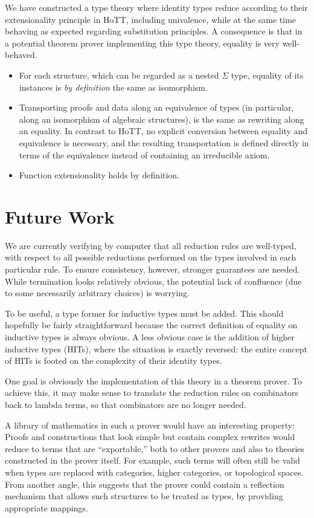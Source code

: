 \documentclass[a4paper]{article}
\theoremstyle{definition}
\theoremstyle{remark}
\newcommand{\0}{\primType{0}}
\newcommand{\1}{\primType{1}}
\newcommand{\2}{\primType{2}}
\begin{document}
We have constructed a type theory where identity types reduce according to their extensionality
principle in HoTT, including univalence, while at the same time behaving as expected regarding
substitution principles. A consequence is that in a potential theorem prover implementing this type
theory, equality is very well-behaved.
\begin{itemize}
  \item For each structure, which can be regarded as a nested $\Sigma$ type, equality of its
  instances is \emph{by definition} the same as isomorphism.
  \item Transporting proofs and data along an equivalence of types (in particular, along an
  isomorphism of algebraic structures), is the same as rewriting along an equality. In contrast to
  HoTT, no explicit conversion between equality and equivalence is necessary, and the resulting
  transportation is defined directly in terms of the equivalence instead of containing an
  irreducible axiom.
  \item Function extensionality holds by definition.
\end{itemize}

\section{Future Work}

We are currently verifying by computer that all reduction rules are well-typed, with respect to all
possible reductions performed on the types involved in each particular rule. To ensure consistency,
however, stronger guarantees are needed. While termination looks relatively obvious, the potential
lack of confluence (due to some necessarily arbitrary choices) is worrying.

To be useful, a type former for inductive types must be added. This should hopefully be fairly
straightforward because the correct definition of equality on inductive types is always obvious.
A less obvious case is the addition of higher inductive types (HITs), where the situation is
exactly reversed: the entire concept of HITs is footed on the complexity of their identity types.

One goal is obviously the implementation of this theory in a theorem prover. To achieve this, it
may make sense to translate the reduction rules on combinators back to lambda terms, so that
combinators are no longer needed.

A library of mathematics in such a prover would have an interesting property: Proofs and
constructions that look simple but contain complex rewrites would reduce to terms that are
``exportable,'' both to other provers and also to theories constructed in the prover itself. For
example, such terms will often still be valid when types are replaced with categories, higher
categories, or topological spaces. From another angle, this suggests that the prover could contain
a reflection mechanism that allows such structures to be treated as types, by providing appropriate
mappings.
\end{document}
